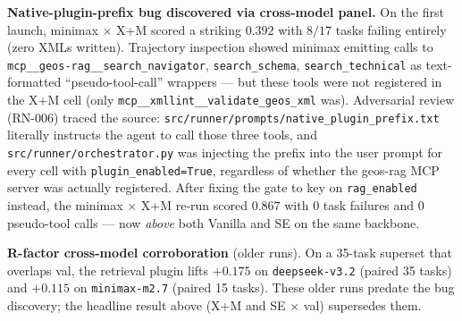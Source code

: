 \documentclass{article}
\begin{document}
\begin{table}[h]
  \caption{Full cross-model and cross-harness panel. Counts in parentheses are task failures out of 17. The minimax × X+M result of $0.392$ in italic is the pre-fix number reported in the project log; the corrected number ($0.867$) replaces it after the prefix-gate bug fix described below.}
  \label{tab:cross-cutting-full}
  \centering
  \small
\end{table}

\textbf{Native-plugin-prefix bug discovered via cross-model panel.} On the first launch, minimax × X+M scored a striking $0.392$ with $8/17$ tasks failing entirely (zero XMLs written). Trajectory inspection showed minimax emitting calls to \texttt{mcp\_\_geos-rag\_\_search\_navigator}, \texttt{search\_schema}, \texttt{search\_technical} as text-formatted ``pseudo-tool-call'' wrappers --- but these tools were not registered in the X+M cell (only \texttt{mcp\_\_xmllint\_\_validate\_geos\_xml} was). Adversarial review (RN-006) traced the source: \texttt{src/runner/prompts/native\_plugin\_prefix.txt} literally instructs the agent to call those three tools, and \texttt{src/runner/orchestrator.py} was injecting the prefix into the user prompt for every cell with \texttt{plugin\_enabled=True}, regardless of whether the geos-rag MCP server was actually registered. After fixing the gate to key on \texttt{rag\_enabled} instead, the minimax × X+M re-run scored $0.867$ with $0$ task failures and $0$ pseudo-tool calls --- now \emph{above} both Vanilla and SE on the same backbone.

\textbf{R-factor cross-model corroboration} (older runs). On a 35-task superset that overlaps val, the retrieval plugin lifts $+0.175$ on \texttt{deepseek-v3.2} (paired 35 tasks) and $+0.115$ on \texttt{minimax-m2.7} (paired 15 tasks). These older runs predate the bug discovery; the headline result above (X+M and SE × val) supersedes them.
\end{document}
